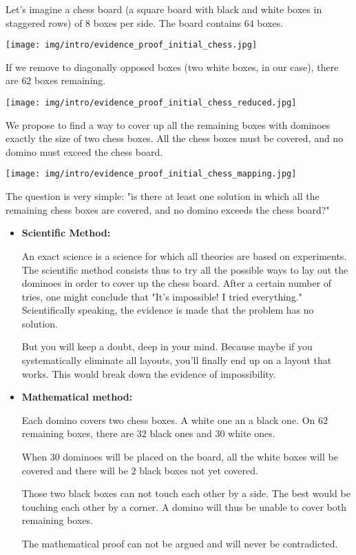 	Let's imagine a chess board (a square board with black and white boxes in staggered rows) of $8$ boxes per side. The board contains $64$ boxes. 
	\begin{center}
		\texttt{[image: img/intro/evidence\_proof\_initial\_chess.jpg]}
	\end{center}	
	If we remove to diagonally opposed boxes (two white boxes, in our case), there are $62$ boxes remaining. 
	\begin{center}
		\texttt{[image: img/intro/evidence\_proof\_initial\_chess\_reduced.jpg]}
	\end{center}
	We propose to find a way to cover up all the remaining boxes with dominoes exactly the size of two chess boxes. All the chess boxes must be covered, and no domino must exceed the chess board.
	\begin{center}
		\texttt{[image: img/intro/evidence\_proof\_initial\_chess\_mapping.jpg]}
	\end{center}
	The question is very simple: "is there at least one solution in which all the remaining chess boxes are covered, and no domino exceeds the chess board?"
	\begin{itemize}
		\item \textbf{Scientific Method:}
		
		An exact science is a science for which all theories are based on experiments. The scientific method consists thus to try all the possible ways to lay out the dominoes in order to cover up the chess board. After a certain number of tries, one might conclude that "It's impossible! I tried everything." Scientifically speaking, the evidence is made that the problem has no solution.
		
		But you will keep a doubt, deep in your mind. Because maybe if you systematically eliminate all layouts, you'll finally end up on a layout that works. This would break down the evidence of impossibility.
	
		\item \textbf{Mathematical method:}
		
		Each domino covers two chess boxes. A white one an a black one.
On $62$ remaining boxes, there are $32$ black ones and $30$ white ones.

		When $30$ dominoes will be placed on the board, all the white boxes will be covered and there will be $2$ black boxes not yet covered.

		Those two black boxes can not touch each other by a side. The best would be touching each other by a corner. A domino will thus be unable to cover both remaining boxes.
	
		The mathematical proof can not be argued and will never be contradicted. 
	\end{itemize}

